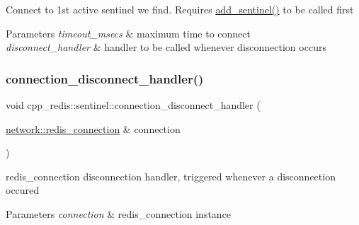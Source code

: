 Connect to 1st active sentinel we find. Requires \hyperlink{classcpp__redis_1_1sentinel_a548dad45711dc2e7da7e0803d5a74a2e}{add\+\_\+sentinel()} to be called first


\begin{DoxyParams}{Parameters}
{\em timeout\+\_\+msecs} & maximum time to connect \\
\hline
{\em disconnect\+\_\+handler} & handler to be called whenever disconnection occurs \\
\hline
\end{DoxyParams}
\mbox{\label{classcpp__redis_1_1sentinel_a2b082c15a48316ae5e8b3ab301796e37}} 
\subsubsection{\texorpdfstring{connection\+\_\+disconnect\+\_\+handler()}{connection\_disconnect\_handler()}}
{\footnotesize\ttfamily void cpp\+\_\+redis\+::sentinel\+::connection\+\_\+disconnect\+\_\+handler (\begin{DoxyParamCaption}\item[{\hyperlink{classcpp__redis_1_1network_1_1redis__connection}{network\+::redis\+\_\+connection} \&}]{connection }\end{DoxyParamCaption})\hspace{0.3cm}{\ttfamily [private]}}

redis\+\_\+connection disconnection handler, triggered whenever a disconnection occured


\begin{DoxyParams}{Parameters}
{\em connection} & redis\+\_\+connection instance \\
\hline
\end{DoxyParams}
\mbox{\label{classcpp__redis_1_1sentinel_af18d66cd6f5fc4408800fe16201cf9c8}} 
